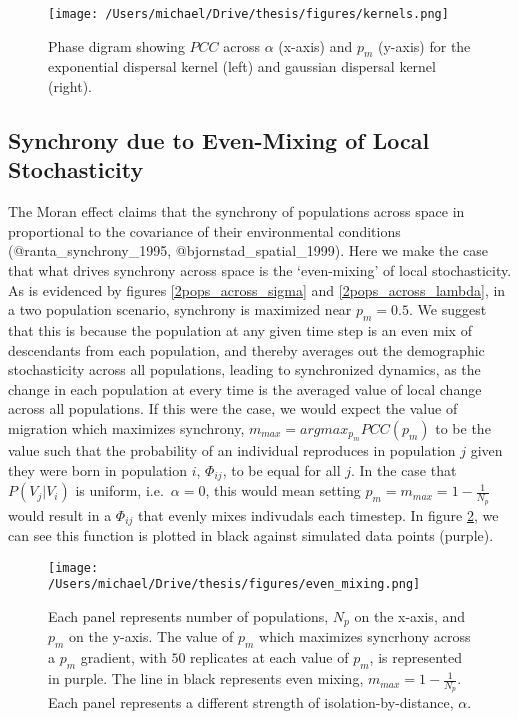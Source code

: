 \begin{figure}[h]

\texttt{[image: /Users/michael/Drive/thesis/figures/kernels.png]}

\caption{Phase digram showing $PCC$ across $\alpha$  (x-axis) and $p_m$ (y-axis) for the exponential dispersal kernel (left) and gaussian dispersal kernel (right). }

\label{kernels}

\end{figure}

\hypertarget{synchrony-due-to-even-mixing-of-local-stochasticity}{%
\subsection{Synchrony due to Even-Mixing of Local
Stochasticity}\label{synchrony-due-to-even-mixing-of-local-stochasticity}}

The Moran effect claims that the synchrony of populations across space
in proportional to the covariance of their environmental conditions
(@ranta\_synchrony\_1995, @bjornstad\_spatial\_1999). Here we make the
case that what drives synchrony across space is the `even-mixing' of
local stochasticity. As is evidenced by figures \ref{2pops_across_sigma}
and \ref{2pops_across_lambda}, in a two population scenario, synchrony
is maximized near \(p_m =0.5\). We suggest that this is because the
population at any given time step is an even mix of descendants from
each population, and thereby averages out the demographic stochasticity
across all populations, leading to synchronized dynamics, as the change
in each population at every time is the averaged value of local change
across all populations. If this were the case, we would expect the value
of migration which maximizes synchrony,
\(m_{max}=arg max_{p_{m}} PCC(p_m)\) to be the value such that the
probability of an individual reproduces in population \(j\) given they
were born in population \(i\), \(\Phi_{ij}\), to be equal for all \(j\).
In the case that \(P(V_j | V_i)\) is uniform, i.e.~\(\alpha = 0\), this
would mean setting \(p_m = m_{max}=1 − \frac{1}{N_p}\) would result in a
\(\Phi_{ij}\) that evenly mixes indivudals each timestep. In figure
\ref{even_mixing}, we can see this function is plotted in black against
simulated data points (purple).

\begin{figure}[h]

\texttt{[image: /Users/michael/Drive/thesis/figures/even\_mixing.png]}

\caption{Each panel represents number of populations, $N_p$ on the x-axis, and $p_m$  on the y-axis. The value of $p_m$ which maximizes syncrhony across a $p_m$ gradient, with $50$ replicates at each value of $p_m$, is represented in purple. The line in black represents even mixing,  $m_{max}=1 - \frac{1}{N_p}$. Each panel represents a different strength of isolation-by-distance, $\alpha$.}

\label{even_mixing}

\end{figure}

